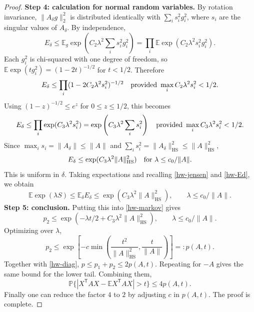 \begin{proof}
\textbf{Step 4: calculation for normal random variables.}
By rotation invariance, $\|A_\delta g\|_2^2$ is distributed identically
with $\sum_i s_i^2g_i^2$, where $s_i$ are the singular values of $A_\delta$.
By independence,
\[
E_\delta\leq\mathbb E_g\exp\left(C_2\lambda^2\sum_i s_i^2g_i^2\right)
=\prod_i\mathbb E\exp(C_2\lambda^2s_i^2g_i^2).
\]
Each $g_i^2$ is chi-squared with one degree of freedom, so
$\mathbb E\exp(tg_i^2)=(1-2t)^{-1/2}$ for $t<1/2$. Therefore
\[
E_\delta\leq\prod_i(1-2C_2\lambda^2s_i^2)^{-1/2}
\quad\hbox{provided }\max_i C_2\lambda^2s_i^2<1/2.
\]
Using $(1-z)^{-1/2}\leq e^z$ for $0\leq z\leq1/2$, this becomes
\[
E_\delta\leq\prod_i\exp(C_3\lambda^2s_i^2)
=\exp\left(C_3\lambda^2\sum_i s_i^2\right)
\quad\hbox{provided }\max_i C_3\lambda^2s_i^2<1/2.
\]
Since $\max_i s_i=\|A_\delta\|\leq\|A\|$ and
$\sum_i s_i^2=\|A_\delta\|_{\mathrm{HS}}^2\leq\|A\|_{\mathrm{HS}}^2$,
\[
E_\delta\leq\exp(C_3\lambda^2\|A\|_{\mathrm{HS}}^2)
\quad\hbox{for }\lambda\leq c_0/\|A\|.
\]
This is uniform in $\delta$. Taking expectations and recalling
\eqref{hw-jensen} and \eqref{hw-Ed}, we obtain
\[
\mathbb E\exp(\lambda S)\leq\mathbb E_\delta E_\delta
\leq\exp(C_3\lambda^2\|A\|_{\mathrm{HS}}^2),\qquad \lambda\leq c_0/\|A\|.
\]
\textbf{Step 5: conclusion.}
Putting this into \eqref{hw-markov} gives
\[
p_2\leq\exp(-\lambda t/2+C_3\lambda^2\|A\|_{\mathrm{HS}}^2),
\qquad\lambda\leq c_0/\|A\|.
\]
Optimizing over $\lambda$,
\[
p_2\leq\exp\left[-c\min\left(\frac{t^2}{\|A\|_{\mathrm{HS}}^2},
\frac{t}{\|A\|}\right)\right]=:p(A,t).
\]
Together with \eqref{hw-diag}, $p\leq p_1+p_2\leq2p(A,t)$.
Repeating for $-A$ gives the same bound for the lower tail. Combining them,
\[
\mathbb P\{|X^{\mathsf T}AX-\mathbb E X^{\mathsf T}AX|>t\}\leq4p(A,t).
\]
Finally one can reduce the factor $4$ to $2$ by adjusting $c$ in $p(A,t)$.
The proof is complete.
\end{proof}
